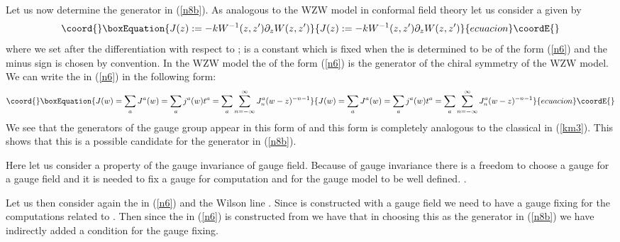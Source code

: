 \documentclass[a4paper,a4paper]{article}
\begin{document}
Let us now determine the generator \coordHE{} in (\ref{n8b}).
As analogous to the WZW model in conformal field theory
\cite{Kni} \cite{Fra} let us consider a \coordHE{} given by
\begin{equation}\coord{}\boxEquation{
J(z) := -k W^{-1}(z, z')\partial_z W(z, z')
\label{n6}
}{
J(z) := -k W^{-1}(z, z')\partial_z W(z, z')
}{ecuacion}\coordE{}\end{equation}
where we set \coordHE{} after the differentiation
with respect to \coordHE{}; \coordHE{} is a constant which is fixed when the \coordHE{} is determined to be of the form (\ref{n6}) and the
minus sign is chosen by convention.
In the WZW model \cite{Kni}\cite{Fra}
 the \coordHE{} of the form (\ref{n6})
is the  generator  of
the chiral symmetry of the WZW model. 
We can write the \coordHE{} in (\ref{n6}) in the following form:
\begin{equation}\coord{}\boxEquation{
 J(w) = \sum_a J^a(w) = 
\sum_a j^a(w) t^a =
\sum_a
\sum_{n=-\infty}^{\infty}J_n^a (w-z)^{-n-1} 
\label{km8}
}{
 J(w) = \sum_a J^a(w) = 
\sum_a j^a(w) t^a =
\sum_a
\sum_{n=-\infty}^{\infty}J_n^a (w-z)^{-n-1} 
}{ecuacion}\coordE{}\end{equation}
We see that the generators \coordHE{} of the gauge group appear
in this form of \coordHE{} and  this form is
completely analogous to the classical \coordHE{} in
(\ref{km3}). This shows that 
 this \coordHE{} is a possible candidate for the generator
\coordHE{} in (\ref{n8b}).

Here let us consider a property of the gauge invariance
of gauge field.
Because of gauge invariance there is a freedom to
choose a gauge for a gauge field and it is needed
to fix a gauge for  computation and for the gauge
model to be well defined.
\cite{Fad}. 

Let us then consider again the \coordHE{} in (\ref{n6})
and the Wilson line \coordHE{}. Since \coordHE{} is constructed
with a gauge field we need to have a gauge fixing
for the computations related to \coordHE{}. Then since the
\coordHE{} in (\ref{n6}) is constructed from \coordHE{}
we have that in choosing this \coordHE{} as the generator
\coordHE{} in (\ref{n8b}) we have indirectly added a condition
for the gauge fixing. 
\end{document}
